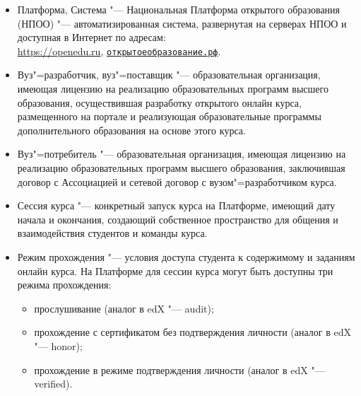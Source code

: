 \begin{itemize}
	\item Платформа, Система "--- Национальная Платформа открытого образования (НПОО) "--- автоматизированная система, 
	развернутая на серверах НПОО и доступная в Интернет по адресам: \\ 
	\url{https://openedu.ru}, \texttt{\href{https://openedu.ru}{открытоеобразование.рф}}.
	\item Вуз"=разработчик, вуз"=поставщик "--- образовательная организация, имеющая лицензию на реализацию образовательных программ 
	высшего образования, осуществившая разработку открытого онлайн курса, размещенного на портале 
	и реализующая образовательные программы дополнительного образования на основе этого курса.
	\item Вуз"=потребитель "--- образовательная организация, имеющая лицензию на реализацию образовательных программ 
	высшего образования, заключившая договор с Ассоциацией и сетевой договор с вузом"=разработчиком курса.
	\item Сессия курса "--- конкретный запуск курса на Платформе, имеющий дату начала и окончания, 
	создающий собственное пространство для общения и взаимодействия студентов и команды курса.
	\item Режим прохождения "--- условия доступа студента к содержимому и заданиям онлайн курса. 
	На Платформе для сессии курса могут быть доступны три режима прохождения:
	\begin{itemize}
		\item прослушивание (аналог в edX "--- audit);
		\item прохождение с сертификатом без подтверждения личности (аналог в edX "--- honor);
		\item прохождение в режиме подтверждения личности (аналог в edX "--- verified).
	\end{itemize}
\end{itemize}


